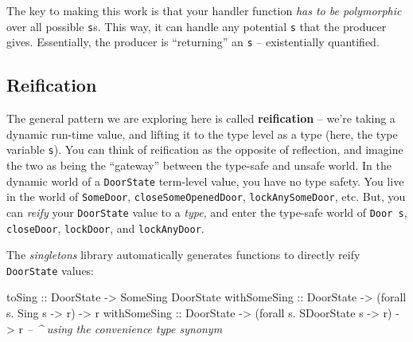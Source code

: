 \documentclass[]{article}
\newenvironment{Shaded}{}{}
\newcommand{\KeywordTok}[1]{\textcolor[rgb]{0.00,0.44,0.13}{\textbf{#1}}}
\newcommand{\DataTypeTok}[1]{\textcolor[rgb]{0.56,0.13,0.00}{#1}}
\newcommand{\StringTok}[1]{\textcolor[rgb]{0.25,0.44,0.63}{#1}}
\newcommand{\CommentTok}[1]{\textcolor[rgb]{0.38,0.63,0.69}{\textit{#1}}}
\newcommand{\OtherTok}[1]{\textcolor[rgb]{0.00,0.44,0.13}{#1}}
\newcommand{\FunctionTok}[1]{\textcolor[rgb]{0.02,0.16,0.49}{#1}}
\newcommand{\NormalTok}[1]{#1}
\begin{document}
\begin{Shaded}
\end{Shaded}

The key to making this work is that your handler function \emph{has to be
polymorphic} over all possible \texttt{s}s. This way, it can handle any
potential \texttt{s} that the producer gives. Essentially, the producer is
``returning'' an \texttt{s} -- existentially quantified.

\subsection{Reification}\label{reification}

The general pattern we are exploring here is called \textbf{reification} --
we're taking a dynamic run-time value, and lifting it to the type level as a
type (here, the type variable \texttt{s}). You can think of reification as the
opposite of reflection, and imagine the two as being the ``gateway'' between the
type-safe and unsafe world. In the dynamic world of a \texttt{DoorState}
term-level value, you have no type safety. You live in the world of
\texttt{SomeDoor}, \texttt{closeSomeOpenedDoor}, \texttt{lockAnySomeDoor}, etc.
But, you can \emph{reify} your \texttt{DoorState} value to a \emph{type}, and
enter the type-safe world of \texttt{Door\ s}, \texttt{closeDoor},
\texttt{lockDoor}, and \texttt{lockAnyDoor}.

The \emph{singletons} library automatically generates functions to directly
reify \texttt{DoorState} values:

\begin{Shaded}
\begin{Highlighting}[]
\OtherTok{toSing       ::} \DataTypeTok{DoorState} \OtherTok{->} \DataTypeTok{SomeSing} \DataTypeTok{DoorState}
\OtherTok{withSomeSing ::} \DataTypeTok{DoorState} \OtherTok{->}\NormalTok{ (forall s}\FunctionTok{.} \DataTypeTok{Sing}\NormalTok{ s        }\OtherTok{->}\NormalTok{ r) }\OtherTok{->}\NormalTok{ r}
\OtherTok{withSomeSing ::} \DataTypeTok{DoorState} \OtherTok{->}\NormalTok{ (forall s}\FunctionTok{.} \DataTypeTok{SDoorState}\NormalTok{ s  }\OtherTok{->}\NormalTok{ r) }\OtherTok{->}\NormalTok{ r}
                                     \CommentTok{-- ^ using the convenience type synonym}
\end{Highlighting}
\end{Shaded}
\end{document}
